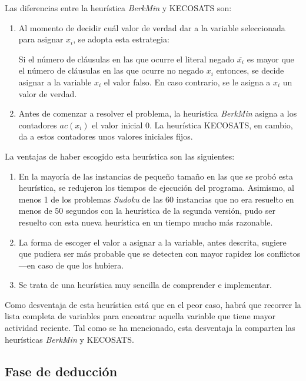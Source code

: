 \documentclass[12pt,lettersize,oneside]{article}
\begin{document}
Las diferencias entre la heurística \emph{BerkMin} y KECOSATS son:\vspace{-2.5mm}
\begin{enumerate}
\item Al momento de decidir cuál valor de verdad dar a la variable seleccionada
  para asignar $x_i$, se adopta esta estrategia: 

  Si el número de cláusulas en las que ocurre el literal negado $\overline{x_i}$
  es mayor que el número de cláusulas en las que ocurre no negado $x_i$
  entonces, se decide asignar a la variable $x_i$ el valor falso. En caso
  contrario, se le asigna a $x_i$ un valor de verdad.

\item Antes de comenzar a resolver el problema, la heurística \emph{BerkMin}
  asigna a los contadores $ac(x_i)$ el valor inicial 0. La heurística KECOSATS,
  en cambio, da a estos contadores unos valores iniciales fijos.
\end{enumerate}

La ventajas de haber escogido esta heurística son las siguientes:
\begin{enumerate}\vspace{-2.5mm}
\item En la mayoría de las instancias de pequeño tamaño en las que se probó esta
  heurística, se redujeron los tiempos de ejecución del programa. Asimismo, al
  menos 1 de los problemas \emph{Sudoku} de las 60 instancias que no era
  resuelto en menos de 50 segundos con la heurística de la segunda versión, pudo
  ser resuelto con esta nueva heurística en un tiempo mucho más razonable.
\item La forma de escoger el valor a asignar a la variable, antes descrita,
  sugiere que pudiera ser más probable que se detecten con mayor rapidez los
  conflictos ---en caso de que los hubiera.
\item Se trata de una heurística muy sencilla de comprender e implementar.
\end{enumerate}

Como desventaja de esta heurística está que en el peor caso, habrá que recorrer
la lista completa de variables para encontrar aquella variable que tiene mayor
actividad reciente. Tal como se ha mencionado, esta desventaja la comparten las
heurísticas \emph{BerkMin} y KECOSATS.

\subsection{Fase de deducción}
\end{document}
